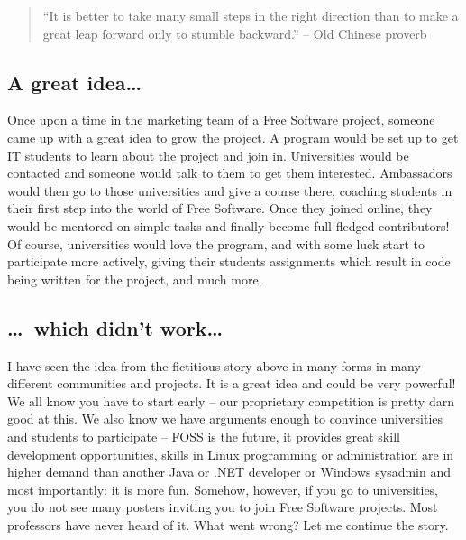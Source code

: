 

\begin{quote}``It is better to take many small steps in the right direction than
to make a great leap forward only to stumble backward.'' -- Old Chinese
proverb\end{quote}

\subsection*{A great idea\dots}
Once upon a time in the marketing team of a Free Software project, someone came
up with a great idea to grow the project. A program would be set up to get IT
students to learn about the project and join in. Universities would be contacted
and someone would talk to them to get them interested. Ambassadors would then go
to those universities and give a course there, coaching students in their first
step into the world of Free Software. Once they joined online, they would be
mentored on simple tasks and finally become full-fledged contributors! Of
course, universities would love the program, and with some luck start to
participate more actively, giving their students assignments which result in
code being written for the project, and much more.

\subsection*{\dots\ which didn't work\dots}
I have seen the idea from the fictitious story above in many forms in many
different communities and projects. It is a great idea and could be very
powerful! We all know you have to start early -- our proprietary competition is
pretty darn good at this. We also know we have arguments enough to convince
universities and students to participate -- FOSS is the future, it provides
great skill development opportunities, skills in Linux programming or
administration are in higher demand than another Java or .NET developer or
Windows sysadmin and most importantly: it is more fun. Somehow, however, if you go
to universities, you do not see many posters inviting you to join Free Software
projects. Most professors have never heard of it. What went wrong? Let me
continue the story.

